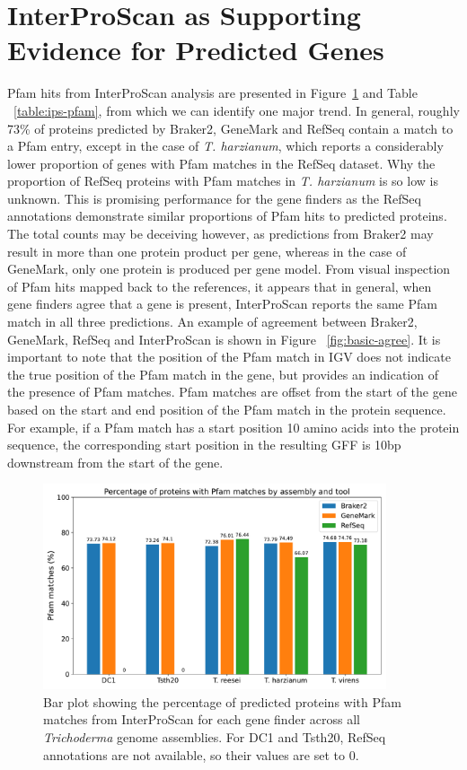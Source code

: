 \section{InterProScan as Supporting Evidence for Predicted Genes}\label{section:interproscan}

Pfam hits from InterProScan analysis are presented in Figure~\ref{fig:ips-counts} and Table
~\ref{table:ips-pfam}, from which we can identify one major trend. In
general, roughly 73\% of proteins predicted by Braker2, GeneMark
and RefSeq contain a match to a Pfam entry, except in the case of
\textit{T. harzianum}, which reports a considerably lower proportion
of genes with Pfam matches in the RefSeq dataset. Why the proportion
of RefSeq proteins with Pfam matches in \textit{T. harzianum} is so
low is unknown. This is promising performance for the gene finders as
the RefSeq annotations demonstrate similar proportions of Pfam hits to
predicted proteins. The total counts may be deceiving however, as
predictions from Braker2 may result in more than one protein product
per gene, whereas in the case of GeneMark, only one protein is
produced per gene model. From visual inspection of Pfam hits mapped
back to the references, it appears that in general, when gene finders
agree that a gene is present, InterProScan reports the same Pfam match
in all three predictions. An example of agreement between Braker2,
GeneMark, RefSeq and InterProScan is shown in Figure
~\ref{fig:basic-agree}. It is important to note that the position of
the Pfam match in IGV does not indicate the true position of the Pfam
match in the gene, but provides an indication of the presence of Pfam
matches. Pfam matches are offset from the start of the gene based on
the start and end position of the Pfam match in the protein
sequence. For example, if a Pfam match has a start position 10 amino
acids into the protein sequence, the corresponding start position in
the resulting GFF is 10bp downstream from the start of the gene.

\begin{figure}
  \centering
  \includegraphics[width=0.90\textwidth]{figures/interproscan-barplot.pdf}
  \caption[Percentage of proteins with Pfam matches]{Bar plot showing the percentage of predicted proteins with Pfam matches from InterProScan for each gene finder across all \textit{Trichoderma} genome assemblies. For DC1 and Tsth20, RefSeq annotations are not available, so their values are set to 0.}\label{fig:ips-counts}
\end{figure}

